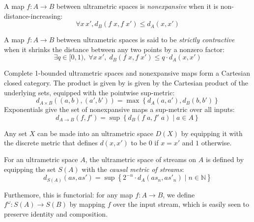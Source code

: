 \documentclass[nocopyrightspace,preprint]{sigplanconf}
\newcommand{\N}{\mathbb{N}}
\newcommand{\setof}[1]{\left\{{#1}\right\}}
\newcommand{\comprehend}[2]{\setof{{#1}\;|\;{#2}}}
\begin{document}
A map $f : A \to B$ between ultrametric spaces is \emph{nonexpansive} when 
it is non-distance-increasing:
\begin{displaymath}
  \forall x\, x', d_B(f\;x, f\;x') \leq d_A(x, x')
\end{displaymath}

A map $f : A \to B$ between ultrametric spaces is said to be
\emph{strictly contractive} when it shrinks the distance between 
any two points by a nonzero factor:
\begin{displaymath}
  \exists q \in [0,1),\;\forall x\, x',\; d_B(f\;x, f\;x') \leq q \cdot d_A(x, x')
\end{displaymath}

Complete 1-bounded ultrametric spaces and nonexpansive maps form a 
Cartesian closed category. The product is given by
is given by the Cartesian product of the underlying sets, equipped with the pointwise sup-metric:
\begin{displaymath}
  d_{A \times B}((a,b), (a',b')) = \max \setof{d_A(a,a'), d_B(b,b')}
\end{displaymath}
Exponentials give the set of nonexpansive maps a sup-metric over all inputs:
\begin{displaymath}
  d_{A \to B}(f, f') = \sup \comprehend{d_B(f\;a,f'\;a)}{a \in A}
\end{displaymath}

Any set $X$ can be made into an ultrametric space $D(X)$ by
equipping it with the discrete metric that defines $d(x,x')$ to be $0$ if $x=x'$ and $1$ otherwise.


For an ultrametric space $A$, the ultrametric space of
streams on $A$ is defined by equipping the set $S(A)$ with 
the \emph{causal metric of streams}:
\begin{displaymath}
  d_{S(A)}(as, as') = \sup \comprehend{2^{-n}\cdot d_A(as_n, as'_n)}{n \in \N}
\end{displaymath}

\noindent Furthemore, this is functorial: for any map $f : A \to B$, 
we define $f^\omega : S(A) \to S(B)$ by mapping $f$ over the input stream, which is easily seen to preserve identity and composition.
\end{document}
